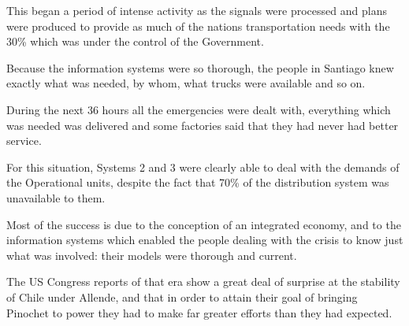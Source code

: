 This began a period of intense activity as the signals were processed and plans were produced to provide as much of the nations transportation needs with the 30\% which was under the control of the Government.

Because the information systems were so thorough, the people in Santiago knew exactly what was needed, by whom, what trucks were available and so on.

During the next 36 hours all the emergencies were dealt with, everything which was needed was delivered and some factories said that they had never had better service.

For this situation, Systems 2 and 3 were clearly able to deal with the demands of the Operational units, despite the fact that 70\% of the distribution system was unavailable to them.

Most of the success is due to the conception of an integrated economy, and to the information systems which enabled the people dealing with the crisis to know just what was involved: their models were thorough and current.

The US Congress reports of that era show a great deal of surprise at the stability of Chile under Allende, and that in order to attain their goal of bringing Pinochet to power they had to make far greater efforts than they had expected.